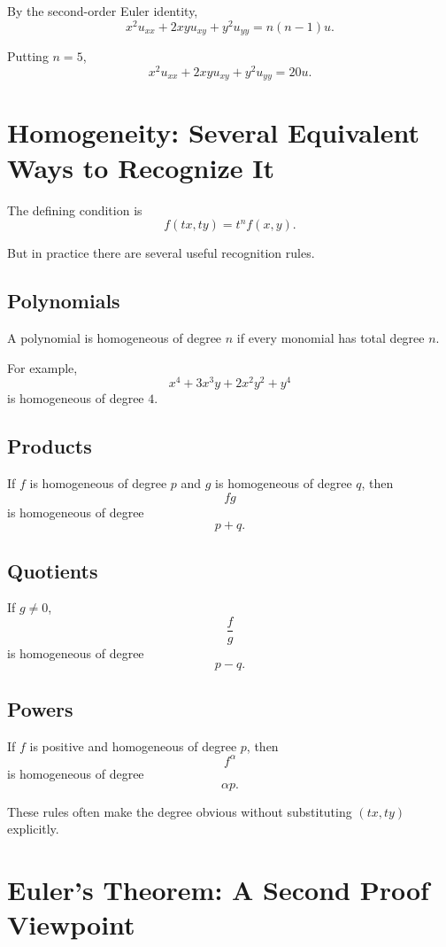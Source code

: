 \documentclass[11pt,oneside]{book}
\theoremstyle{studentthm}
\theoremstyle{definition}
\begin{document}
By the second-order Euler identity,
\[
x^2u_{xx}+2xyu_{xy}+y^2u_{yy}
=
n(n-1)u.
\]

Putting \(n=5\),
\[
x^2u_{xx}+2xyu_{xy}+y^2u_{yy}
=
20u.
\]



\section{Homogeneity: Several Equivalent Ways to Recognize It}

The defining condition is
\[
f(tx,ty)=t^nf(x,y).
\]

But in practice there are several useful recognition rules.

\subsection*{Polynomials}

A polynomial is homogeneous of degree \(n\) if every monomial has total
degree \(n\).

For example,
\[
x^4+3x^3y+2x^2y^2+y^4
\]
is homogeneous of degree \(4\).

\subsection*{Products}

If \(f\) is homogeneous of degree \(p\) and \(g\) is homogeneous of
degree \(q\), then
\[
fg
\]
is homogeneous of degree
\[
p+q.
\]

\subsection*{Quotients}

If \(g\ne0\),
\[
\frac{f}{g}
\]
is homogeneous of degree
\[
p-q.
\]

\subsection*{Powers}

If \(f\) is positive and homogeneous of degree \(p\), then
\[
f^\alpha
\]
is homogeneous of degree
\[
\alpha p.
\]

These rules often make the degree obvious without substituting
\((tx,ty)\) explicitly.

\section{Euler's Theorem: A Second Proof Viewpoint}
\end{document}
